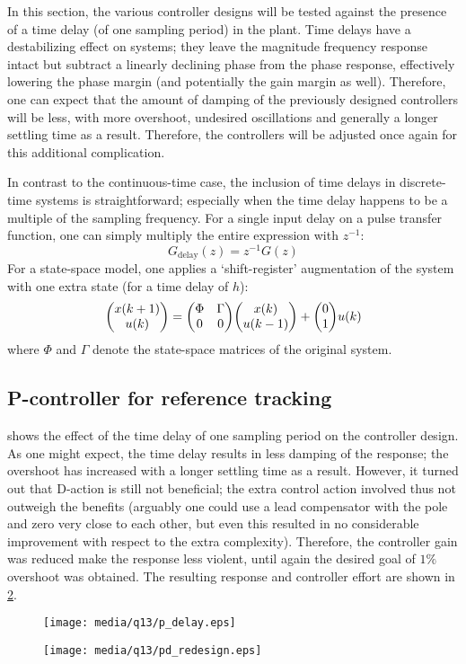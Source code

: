 In this section, the various controller designs will be tested against the presence of a time delay (of one sampling period) in the plant. Time delays have a destabilizing effect on systems; they leave the magnitude frequency response intact but subtract a linearly declining phase from the phase response, effectively lowering the phase margin (and potentially the gain margin as well). Therefore, one can expect that the amount of damping of the previously designed controllers will be less, with more overshoot, undesired oscillations and generally a longer settling time as a result. Therefore, the controllers will be adjusted once again for this additional complication. \cite{nise}

In contrast to the continuous-time case, the inclusion of time delays in discrete-time systems is straightforward; especially when the time delay happens to be a multiple of the sampling frequency. For a single input delay on a pulse transfer function, one can simply multiply the entire expression with $z^{-1}$:
                         $$ G_\text{delay}(z) = z^{-1}G(z) $$
For a state-space model, one applies a `shift-register' augmentation of the system with one extra state (for a time delay of $h$):
                    $$ \mqty(x(k+1)\\u(k)) = \mqty(\Phi & \Gamma\\0&0)\mqty(x(k)\\u(k-1)) + \mqty(0\\1)u(k)$$ 
where $\Phi$ and $\Gamma$ denote the state-space matrices of the original system.

\subsection{P-controller for reference tracking}
 shows the effect of the time delay of one sampling period on the controller design. As one might expect, the time delay results in less damping of the response; the overshoot has increased with a longer settling time as a result. However, it turned out that D-action is still not beneficial; the extra control action involved thus not outweigh the benefits (arguably one could use a lead compensator with the pole and zero very close to each other, but even this resulted in no considerable improvement with respect to the extra complexity). Therefore, the controller gain was reduced make the response less violent, until again the desired goal of $1\%$ overshoot was obtained. The resulting response and controller effort are shown in \cref{fig:q13_pd_redesign}.
\begin{figure}[ht]
    \centering
    \texttt{[image: media/q13/p\_delay.eps]}
    \caption{}
    \label{fig:q13_p_delay}
\end{figure}
\begin{figure}[ht]
    \centering
    \texttt{[image: media/q13/pd\_redesign.eps]}
    \caption{}
    \label{fig:q13_pd_redesign}
\end{figure}
\FloatBarrier

